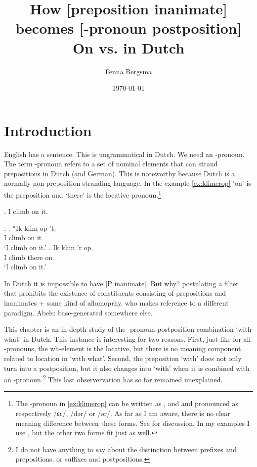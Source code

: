 \documentclass[12pt]{article}
\title{How [preposition inanimate] becomes [\tsc{r}-pronoun postposition]\\
On \tit{waarmee} vs. \tit{met wat} in Dutch}
\author{Fenna Bergsma}
\date{\today}
\begin{document}
\maketitle



\section{Introduction}

English has a sentence. This is ungrammatical in Dutch. We need an -pronoun. The term -pronoun \citep{riemsdijk1978} refers to a set of nominal elements that can strand prepositions in Dutch (and German). This is noteworthy because Dutch is a normally non-preposition stranding language.
In the example \ref{ex:klimerop}  `on' is the preposition and  `there' is the locative pronoun.\footnote{The -pronoun  in \ref{ex:klimerop} can be written as ,  and  and pronounced as respectively /ɛr/, /dər/ or /ər/. As far as I am aware, there is no clear meaning difference between these forms. See \citet{wesseling2018} for discussion. In my examples I use , but the other two forms fit just as well.}

\ex. I climb on it.

\ex.
\ag. *Ik klim op 't.\\
 I climb on it\\
 `I climb on it.'\label{ex:klimopt}
\bg. Ik klim 'r op.\\
 I climb there on\\
 `I climb on it.'\label{ex:klimerop}

In Dutch it is impossible to have [P inanimate]. But why? \citet{riemsdijk1978} postulating a filter that prohibits the existence of constituents consisting of prepositions and inanimates + some kind of allomoprhy. \citet{koopman2000} who makes reference to a different paradigm. Abels: base-generated somewhere else.

This chapter is an in-depth study of the -pronoun-postposition combination  `with what' in Dutch. This instance is interesting for two reasons. First, just like for all -pronouns, the wh-element is the locative, but there is no meaning component related to location in `with what'. Second, the preposition  `with' does not only turn into a postposition, but it also changes into  `with' when it is combined with an -pronoun.\footnote{I do not have anything to say about the distinction between prefixes and prepositions, or suffixes and postpositions.} This last observervation has so far remained unexplained.
\end{document}
